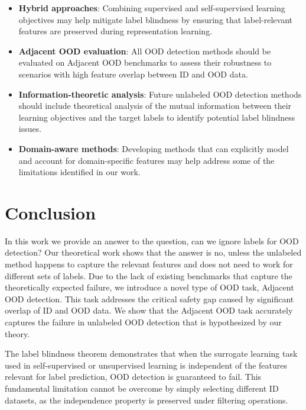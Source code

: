 \documentclass[11pt, oneside]{book}
\theoremstyle{plain}
\theoremstyle{definition}
\theoremstyle{remark}
\begin{document}
\begin{itemize}
\item \textbf{Hybrid approaches}: Combining supervised and self-supervised learning objectives may help mitigate label blindness by ensuring that label-relevant features are preserved during representation learning.

\item \textbf{Adjacent OOD evaluation}: All OOD detection methods should be evaluated on Adjacent OOD benchmarks to assess their robustness to scenarios with high feature overlap between ID and OOD data.

\item \textbf{Information-theoretic analysis}: Future unlabeled OOD detection methods should include theoretical analysis of the mutual information between their learning objectives and the target labels to identify potential label blindness issues.

\item \textbf{Domain-aware methods}: Developing methods that can explicitly model and account for domain-specific features may help address some of the limitations identified in our work.
\end{itemize}

\section{Conclusion}

In this work we provide an answer to the question, can we ignore labels for OOD detection? Our theoretical work shows that the answer is no, unless the unlabeled method happens to capture the relevant features and does not need to work for different sets of labels. Due to the lack of existing benchmarks that capture the theoretically expected failure, we introduce a novel type of OOD task, Adjacent OOD detection. This task addresses the critical safety gap caused by significant overlap of ID and OOD data. We show that the Adjacent OOD task accurately captures the failure in unlabeled OOD detection that is hypothesized by our theory.

The label blindness theorem demonstrates that when the surrogate learning task used in self-supervised or unsupervised learning is independent of the features relevant for label prediction, OOD detection is guaranteed to fail. This fundamental limitation cannot be overcome by simply selecting different ID datasets, as the independence property is preserved under filtering operations.
\end{document}
